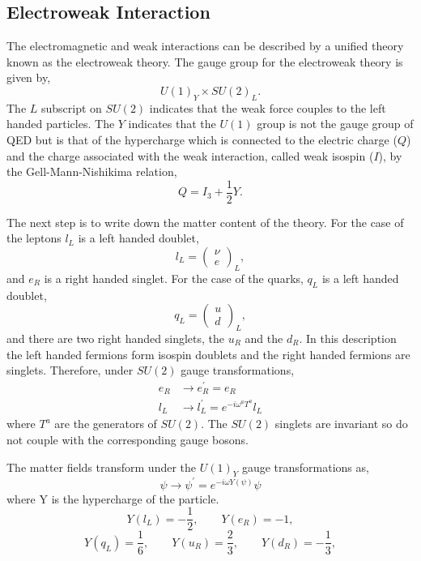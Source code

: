 \subsection{Electroweak Interaction}
The electromagnetic and weak interactions can be described by a unified theory
known as the electroweak theory.
The gauge group for the electroweak theory is given by,
\begin{equation}
U(1)_{Y} \times SU(2)_{L} .
\end{equation}
The $L$ subscript on $SU(2)$ indicates that the weak force couples to the left
handed particles. 
The $Y$ indicates that the $U(1)$ group is not the gauge
group of QED but is that of the hypercharge which is connected to the electric
charge ($Q$) and the charge associated with the weak interaction, called weak
isospin ($I$), by the Gell-Mann-Nishikima relation,
\begin{equation}
Q = I_{3}+ \frac{1}{2}Y.
\end{equation}

The next step is to write down the matter content of the theory. 
For the case of the leptons $l_{L}$ is a left
handed doublet,
\begin{equation}
l_{L} = \left( \begin{matrix} \nu \\ e \end{matrix} \right)_{L},
\end{equation}
and $e_{R}$ is a right handed singlet.
For the case of the quarks, $q_{L}$ is a left handed doublet,
\begin{equation}
q_{L} = \left( \begin{matrix} u\\ d \end{matrix} \right)_{L},
\end{equation}
and there are two right handed singlets, the $u_{R}$ and the $d_{R}$.
In this description the left handed fermions form isospin doublets and the right
handed fermions are singlets. Therefore, under $SU(2)$ gauge transformations,
\begin{align}
e_{R} &\to e_{R}^{\prime} = e_{R}\\
l_{L} &\to l_{L}^{\prime} = e^{-i \omega^{a} {T}^{a} }l_{L}
\end{align}
where $T^{a}$ are the generators of $SU(2)$.  The $SU(2)$ singlets are invariant
so do not couple with the corresponding gauge bosons.

The matter fields transform under the $U(1)_Y$ gauge transformations as,
\begin{equation}
\psi \to \psi^{\prime} = e^{-i\omega Y(\psi)}\psi
\end{equation}
where Y is the hypercharge of the particle.
\begin{equation}
Y(l_{L}) = -\frac{1}{2}, \qquad Y(e_{R}) = -1,
\end{equation}
\begin{equation}
Y(q_{L}) =  \frac{1}{6}, \qquad Y(u_{R}) =  \frac{2}{3}, \qquad Y(d_{R}) = -\frac{1}{3},
\end{equation}

